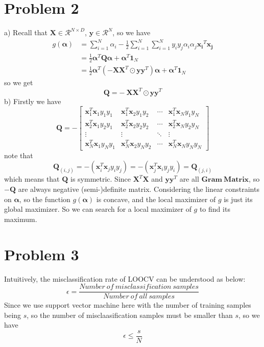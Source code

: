 \documentclass{article}
\begin{document}
\section*{Problem 2}
a) Recall that $\bm{X} \in \mathcal{R}^{N \times D}$, $\bm{y} \in \mathcal{R}^N$, so we have
\begin{equation}
	\begin{aligned}
		g(\bm{\alpha})
		&= \sum_{i=1}^{N} \alpha_i - \frac{1}{2}\sum_{i=1}^{N} \sum_{i=1}^{N} y_i y_j \alpha_i \alpha_j \bm{x_i}^T\bm{x_j} \\
		&= \frac{1}{2} \bm{\alpha}^T\bm{Q} \bm{\alpha} +\bm{\alpha}^T\bm{1}_N\\
		&= \frac{1}{2} \bm{\alpha}^T(-\bm{X}\bm{X}^T \odot \bm{y}\bm{y}^T) \bm{\alpha} +\bm{\alpha}^T\bm{1}_N
	\end{aligned}
\end{equation}
so we get
\begin{equation}
	\bm{Q} = -\ \bm{X}\bm{X}^T \odot \bm{y}\bm{y}^T
\end{equation}
b) Firstly we have
\begin{equation}
	\bm{Q}  = - \left[
	\begin{matrix}
	\bm{x}_1^T\bm{x}_1y_1y_1 & \bm{x}_1^T\bm{x}_2y_1y_2 & \cdots & \bm{x}_1^T\bm{x}_Ny_1y_N \\
	\bm{x}_2^T\bm{x}_1y_2y_1 & \bm{x}_2^T\bm{x}_2y_2y_2 & \cdots & \bm{x}_2^T\bm{x}_Ny_2y_N \\
	\vdots & \vdots & \ddots & \vdots \\
	\bm{x}_N^T\bm{x}_1y_Ny_1 & \bm{x}_N^T\bm{x}_2y_Ny_2 & \cdots & \bm{x}_N^T\bm{x}_Ny_Ny_N	
	\end{matrix}
	\right]
\end{equation}
note that
\begin{equation}
	\bm{Q}_{(i,j)} = - (\bm{x}_i^T\bm{x}_jy_iy_j) = - (\bm{x}_j^T\bm{x}_iy_jy_i) = \bm{Q}_{(j,i)}
\end{equation}
which means that $\bm{Q}$ is symmetric. 
Since $\bm{X}^T\bm{X}$ and $\bm{y}\bm{y}^T$ are all $\bm{Gram \ Matrix}$, so $-\bm{Q}$ are always negative (semi-)definite matrix. Considering the linear constraints on $\bm{\alpha}$, so the function $g(\bm{\alpha})$ is concave, and the local maximizer of $g$ is just its global maximizer. So we can search for a local maximizer of $g$ to find its maximum.


\section*{Problem 3}
Intuitively, the misclassification rate of LOOCV can be understood as below:
\begin{equation}
	\epsilon = \frac{Number\ of\ misclassification\ samples}{Number\ of\ all\ samples}
\end{equation}
Since we use support vector machine here with the number of training samples being $s$, so the number of misclaasification samples must be smaller than $s$, so we have
\begin{equation}
	\epsilon \leq \frac{s}{N}
\end{equation}
\end{document}

